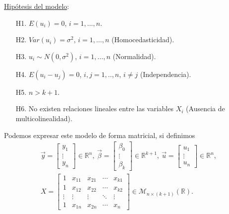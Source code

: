 \underline{Hipótesis del modelo}:
\begin{enumerate}
    \item[H1.] $E(u_i) = 0$, $i = 1,\ldots,n$.
    \item[H2.] $Var(u_i) = \sigma^2$, $i = 1,\ldots,n$ (Homocedasticidad).
    \item[H3.] $u_i \sim N(0,\sigma^2)$, $i = 1,\ldots,n$ (Normalidad).
    \item[H4.] $E(u_i - u_j) = 0$, $i,j=1,..,n$, $i \not = j$ (Independencia).
    \item[H5.] $n > k+1$.
    \item[H6.] No existen relaciones lineales entre las variables $X_i$ (Ausencia de multicolinealidad).
\end{enumerate}
Podemos expresar este modelo de forma matricial, si definimos
\begin{align*}
    \vec{y} = \begin{bmatrix}
                  y_1    \\
                  \vdots \\
                  y_n
              \end{bmatrix} \in \mathbb{R}^n, \ \vec{\beta} = \begin{bmatrix}
                                                                  \beta_0 \\
                                                                  \vdots  \\
                                                                  \beta_k
                                                              \end{bmatrix} \in \mathbb{R}^{k+1}, \ \vec{u} = \begin{bmatrix}
                                                                                                                  u_1    \\
                                                                                                                  \vdots \\
                                                                                                                  u_n
                                                                                                              \end{bmatrix} \in \mathbb{R}^n, \\
    X = \begin{bmatrix}
            1      & x_{11} & x_{21} & \cdots & x_{k1} \\
            1      & x_{12} & x_{22} & \cdots & x_{k2} \\
            \vdots & \vdots & \vdots & \ddots & \vdots \\
            1      & x_{1n} & x_{2n} & \cdots & x_{n}
        \end{bmatrix} \in \mathcal{M}_{n \times (k+1)} (\mathbb{R}).
\end{align*}
